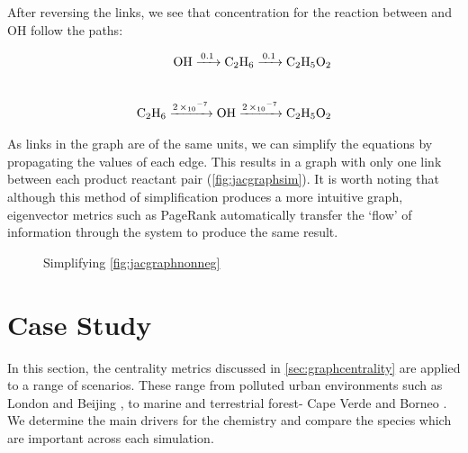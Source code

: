 After reversing the links, we see that concentration for the reaction between  and OH follow the paths:

\begin{eqnarray}
    \ce{OH ->[0.1] C2H6 ->[0.1] C2H5O2} \\[20pt]
    \ce{C2H6 ->[2\times10^{-7}] OH ->[2\times10^{-7}] C2H5O2}
\end{eqnarray}



As links in the graph are of the same units, we can simplify the equations by propagating the values of each edge.  This results in a graph with only one link between each product reactant pair (\autoref{fig:jacgraphsim}). It is worth noting that although this method of simplification produces a more intuitive graph, eigenvector metrics such as PageRank automatically transfer the `flow' of information through the system to produce the same result.

\begin{figure}[H]
\begin{center}

\end{center}

\caption{ Simplifying \autoref{fig:jacgraphnonneg}}
\label{fig:jacgraphsim}
\end{figure}


\section{Case Study}\label{sec:metriccase}
In this section, the centrality metrics discussed in \autoref{sec:graphcentrality} are applied to a range of scenarios. These range from polluted urban environments such as London \citep{clfo} and Beijing \cite{aphh}, to marine and terrestrial forest- Cape Verde \cite{capeverde} and Borneo \citep{borneo}. We determine the main drivers for the chemistry and compare the species which are important across each simulation.

